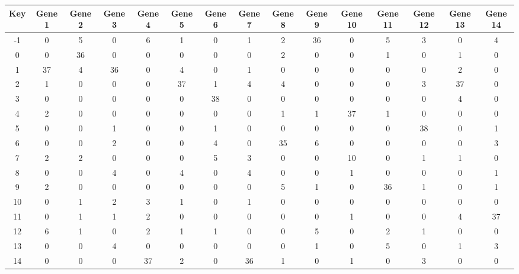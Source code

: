 \begin{tabular}{|c|c|c|c|c|c|c|c|c|c|c|c|c|c|c|}
\hline
Key & Gene 1 & Gene 2 & Gene 3 & Gene 4 & Gene 5 & Gene 6 & Gene 7 & Gene 8 & Gene 9 & Gene 10 & Gene 11 & Gene 12 & Gene 13 & Gene 14 \\
\hline
-1 & 0 & 5 & 0 & 6 & 1 & 0 & 1 & 2 & 36 & 0 & 5 & 3 & 0 & 4 \\
0 & 0 & 36 & 0 & 0 & 0 & 0 & 0 & 2 & 0 & 0 & 1 & 0 & 1 & 0 \\
1 & 37 & 4 & 36 & 0 & 4 & 0 & 1 & 0 & 0 & 0 & 0 & 0 & 2 & 0 \\
2 & 1 & 0 & 0 & 0 & 37 & 1 & 4 & 4 & 0 & 0 & 0 & 3 & 37 & 0 \\
3 & 0 & 0 & 0 & 0 & 0 & 38 & 0 & 0 & 0 & 0 & 0 & 0 & 4 & 0 \\
4 & 2 & 0 & 0 & 0 & 0 & 0 & 0 & 1 & 1 & 37 & 1 & 0 & 0 & 0 \\
5 & 0 & 0 & 1 & 0 & 0 & 1 & 0 & 0 & 0 & 0 & 0 & 38 & 0 & 1 \\
6 & 0 & 0 & 2 & 0 & 0 & 4 & 0 & 35 & 6 & 0 & 0 & 0 & 0 & 3 \\
7 & 2 & 2 & 0 & 0 & 0 & 5 & 3 & 0 & 0 & 10 & 0 & 1 & 1 & 0 \\
8 & 0 & 0 & 4 & 0 & 4 & 0 & 4 & 0 & 0 & 1 & 0 & 0 & 0 & 1 \\
9 & 2 & 0 & 0 & 0 & 0 & 0 & 0 & 5 & 1 & 0 & 36 & 1 & 0 & 1 \\
10 & 0 & 1 & 2 & 3 & 1 & 0 & 1 & 0 & 0 & 0 & 0 & 0 & 0 & 0 \\
11 & 0 & 1 & 1 & 2 & 0 & 0 & 0 & 0 & 0 & 1 & 0 & 0 & 4 & 37 \\
12 & 6 & 1 & 0 & 2 & 1 & 1 & 0 & 0 & 5 & 0 & 2 & 1 & 0 & 0 \\
13 & 0 & 0 & 4 & 0 & 0 & 0 & 0 & 0 & 1 & 0 & 5 & 0 & 1 & 3 \\
14 & 0 & 0 & 0 & 37 & 2 & 0 & 36 & 1 & 0 & 1 & 0 & 3 & 0 & 0 \\
\hline
\end{tabular}